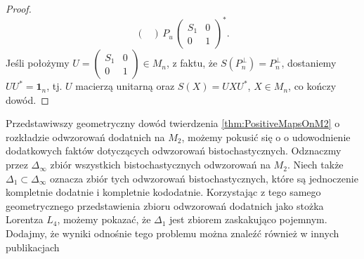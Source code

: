 \begin{proof}
\begin{equation}
\begin{pmatrix}
    \end{pmatrix}
    \, P_{u} \,
    \begin{pmatrix}
    S_{1} & 0 \\ 0 & 1
    \end{pmatrix}^{*}.
\end{equation}
Jeśli położymy $U = \left( \begin{smallmatrix} S_{1} & 0 \\ 0 & 1
\end{smallmatrix} \right) \in M_{n}$,
z faktu, że $S(P_{n}^{\perp}) = P_{n}^{\perp}$,
dostaniemy $U U^{*} = \mathbf{1}_{n}$, tj. $U$ macierzą unitarną oraz
$S(X) = U X U^{*}$, $X \in M_{n}$, co kończy dowód.
\end{proof}

Przedstawiwszy geometryczny dowód twierdzenia \ref{thm:PositiveMapsOnM2}
o rozkładzie odwzorowań dodatnich na $M_{2}$, możemy pokusić się o
o udowodnienie dodatkowych faktów dotyczących odwzorowań bistochastycznych.
Odznaczmy przez $\Delta_{\infty}$ zbiór wszystkich bistochastycznych odwzorowań na
$M_{2}$.
Niech także $\Delta_{1} \subset \Delta_{\infty}$ oznacza zbiór tych odwzorowań
bistochastycznych,
które są jednoczenie kompletnie dodatnie i kompletnie kododatnie.
Korzystając z tego samego geometrycznego przedstawienia zbioru
odwzorowań dodatnich jako stożka Lorentza $L_{4}$,
możemy pokazać, że $\Delta_{1}$ jest zbiorem zaskakująco pojemnym.
Dodajmy, że wyniki odnośnie tego problemu można znaleźć również w innych
publikacjach
